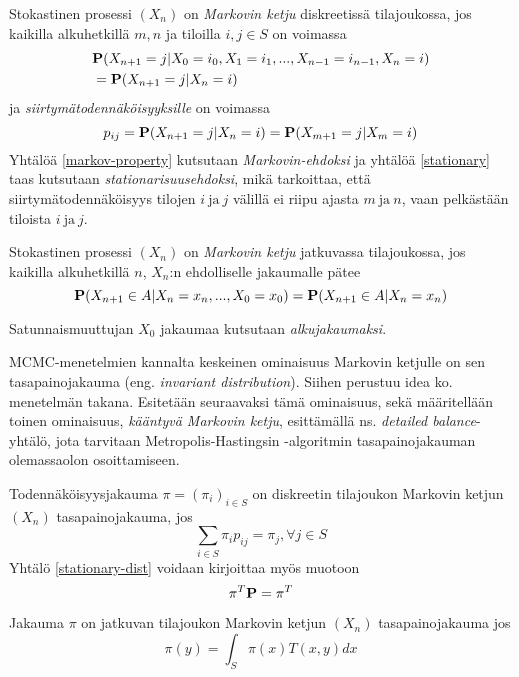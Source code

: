 \begin{maar}\label{markovin-ehto-d}
	Stokastinen prosessi $(X_n)$ on \textit{Markovin ketju} diskreetissä tilajoukossa, jos kaikilla alkuhetkillä $m,n$ ja tiloilla $i,j\in S$ on voimassa
	\begin{equation}\label{markov-property}
		\begin{split}
			&\textbf{P}(X_{n+1}=j|X_0=i_0,X_1=i_1,...,X_{n-1}=i_{n-1},X_n=i) \\
		 &= \textbf{P}(X_{n+1}=j|X_n=i) 
		\end{split}
	\end{equation}
	ja \textit{siirtymätodennäköisyyksille} on voimassa 
	\begin{equation}\label{stationary}
		p_{ij}=\textbf{P}(X_{n+1}=j|X_n=i)=\textbf{P}(X_{m+1}=j|X_m=i)
	\end{equation}
	Yhtälöä \ref{markov-property} kutsutaan \textit{Markovin-ehdoksi} ja yhtälöä \ref{stationary} taas kutsutaan \textit{stationarisuusehdoksi}, mikä tarkoittaa, 
	että siirtymätodennäköisyys tilojen $i\ \text{ja}\ j$ välillä ei riipu ajasta $m\ \text{ja}\ n$, vaan pelkästään tiloista $i\ \text{ja}\ j$.
\end{maar}

\begin{maar}\label{markov-maar-c}
	Stokastinen prosessi $(X_n)$ on \textit{Markovin ketju} jatkuvassa tilajoukossa, jos kaikilla alkuhetkillä $n$, $X_n$:n ehdolliselle jakaumalle pätee
	\begin{equation}
		\textbf{P}(X_{n+1} \in A | X_n=x_{n},...,X_0=x_0) = \textbf{P}(X_{n+1}\in A | X_n=x_{n})
	\end{equation}
\end{maar}

\begin{maar}
	Satunnaismuuttujan $X_0$ jakaumaa kutsutaan \textit{alkujakaumaksi}. 
\end{maar}

MCMC-menetelmien kannalta keskeinen ominaisuus Markovin ketjulle on sen tasapainojakauma (eng. \textit{invariant distribution}). Siihen perustuu idea ko. menetelmän takana. Esitetään seuraavaksi tämä ominaisuus, sekä määritellään toinen ominaisuus, \textit{kääntyvä Markovin ketju}, esittämällä ns. \textit{detailed balance}-yhtälö, jota tarvitaan Metropolis-Hastingsin -algoritmin tasapainojakauman olemassaolon osoittamiseen. 

\begin{maar}
	Todennäköisyysjakauma $\pi=(\pi_i)_{i\in S}$ on diskreetin tilajoukon Markovin ketjun $(X_n)$ tasapainojakauma, jos 
	\begin{equation}\label{stationary-dist}
		\sum_{i\in S} \pi_i p_{ij}=\pi_j, \forall j\in S
	\end{equation}
	Yhtälö \eqref{stationary-dist} voidaan kirjoittaa myös muotoon 
	\begin{equation}\label{stationary-dist2}
		\pi^T\textbf{P}= \pi^T
	\end{equation}
	
	Jakauma $\pi$ on jatkuvan tilajoukon Markovin ketjun $( X_n )$ tasapainojakauma jos 
	\begin{equation}
		\pi(y) = \int_S \pi(x) T(x,y) dx
	\end{equation}
\end{maar}

